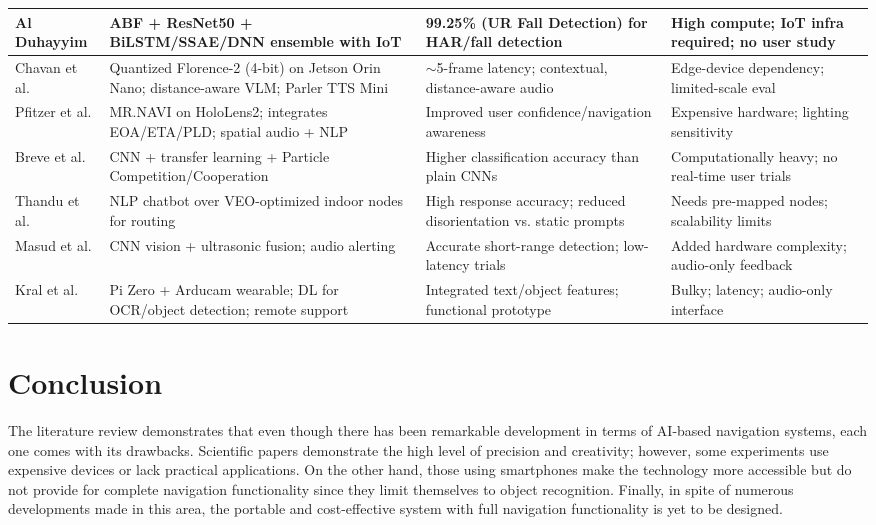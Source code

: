 \documentclass{FastFyp}
\begin{document}
\begin{table}[h!]
\begin{tabular}{|p{3cm}|p{4cm}|p{4cm}|p{3cm}|}
Al Duhayyim \cite{ref:al2025ensemble} & ABF + ResNet50 + BiLSTM/SSAE/DNN ensemble with IoT & 99.25\% (UR Fall Detection) for HAR/fall detection & High compute; IoT infra required; no user study \\ \hline

Chavan et al. \cite{ref:chavan2024vocaleyes} & Quantized Florence-2 (4-bit) on Jetson Orin Nano; distance-aware VLM; Parler TTS Mini & \(\sim\)5-frame latency; contextual, distance-aware audio & Edge-device dependency; limited-scale eval \\ \hline

Pfitzer et al. \cite{ref:pfitzer2025mr} & MR.NAVI on HoloLens2; integrates EOA/ETA/PLD; spatial audio + NLP & Improved user confidence/navigation awareness & Expensive hardware; lighting sensitivity \\ \hline

Breve et al. \cite{ref:breve2020visually} & CNN + transfer learning + Particle Competition/Cooperation & Higher classification accuracy than plain CNNs & Computationally heavy; no real-time user trials \\ \hline

Thandu et al. \cite{ref:thandu2024enhancing} & NLP chatbot over VEO-optimized indoor nodes for routing & High response accuracy; reduced disorientation vs. static prompts & Needs pre-mapped nodes; scalability limits \\ \hline

Masud et al. \cite{ref:masud2022smart} & CNN vision + ultrasonic fusion; audio alerting & Accurate short-range detection; low-latency trials & Added hardware complexity; audio-only feedback \\ \hline

Kral et al. \cite{ref:kral2025low} & Pi Zero + Arducam wearable; DL for OCR/object detection; remote support & Integrated text/object features; functional prototype & Bulky; latency; audio-only interface \\ \hline

\end{tabular}
\end{table}

\pagebreak

\section{Conclusion}
The literature review demonstrates that even though there has been remarkable development in terms of AI-based navigation systems, each one comes with its drawbacks. Scientific papers demonstrate the high level of precision and creativity; however, some experiments use expensive devices or lack practical applications. On the other hand, those using smartphones make the technology more accessible but do not provide for complete navigation functionality since they limit themselves to object recognition. Finally, in spite of numerous developments made in this area, the portable and cost-effective system with full navigation functionality is yet to be designed.
\end{document}

